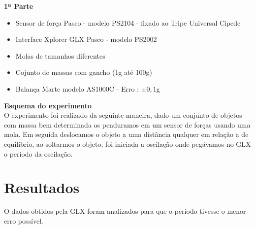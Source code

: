\documentclass{article}
\begin{document}
\textbf{1ª Parte}
\begin{itemize}
\item Sensor de força Pasco - modelo PS2104 - fixado ao Tripe Universal Cipede
\item Interface Xplorer GLX Pasco - modelo PS2002
\item Molas de tamanhos diferentes
\item Cojunto de massas com gancho (1g até 100g)
\item Balança Marte modelo AS1000C - Erro : $\pm 0,1$g
\end{itemize}

\newpage

\textbf{Esquema do experimento}\\
    O experimento foi realizado da seguinte maneira, dado um conjunto de objetos com massa bem determinada os penduramos em um sensor de forças usando uma mola. Em seguida deslocamos o objeto a uma distância qualquer em relação a de equilíbrio, ao soltarmos o objeto, foi iniciada a oscilação onde pegávamos no GLX o período da oscilação.
    \\


\section{Resultados}

O dados obtidos pela GLX foram analizados para que o período tivesse o menor erro possível.\\
\end{document}
